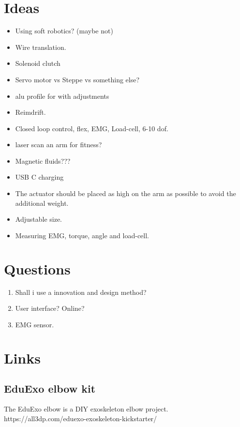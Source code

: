 \section{Ideas}
\begin{itemize}
    \item Using soft robotics? (maybe not) 
    \item Wire translation.
    \item Solenoid clutch 
    \item Servo motor vs Steppe vs something else? 
    \item alu profile for with adjustments 
    \item Reimdrift.
    \item Closed loop control, flex, EMG, Load-cell, 6-10 dof. 
    \item laser scan an arm for fitness? 
    \item Magnetic fluids??? 
    \item USB C charging
    \item The actuator should be placed as high on the arm as possible to avoid the additional weight. 
    \item Adjustable size. 
    \item Measuring EMG, torque, angle and load-cell. 
    
\end{itemize}{}

\section{Questions}
\begin{enumerate}
    \item Shall i use a innovation and design method? 
    \item User interface? Online? 
    \item EMG sensor. 
\end{enumerate}{}



\section{Links}
\subsection{EduExo elbow kit}
The EduExo elbow is a DIY exoskeleton elbow project. \newline
https://all3dp.com/eduexo-exoskeleton-kickstarter/

